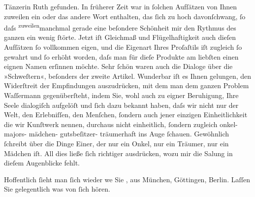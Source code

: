                Tänzerin Ruth gefunden. In früherer Zeit war
               in{ }ſolchen Aufſätzen von Ihnen zuweilen ein oder das andere Wort enthalten, das{ }ſich
               zu hoch davonſchwang,{ }ſo daſs \substVorne{}\textsuperscript{zuweilen}\substDazwischen{}manchmal\substHinten{} gerade eine beſondere Schönheit mir den Rythmus des ganzen ein wenig{ }ſtörte.
               Jetzt iſt Gleichmaß und {\pb}Flügelhaftigkeit auch dieſen
               Aufſätzen{ }ſo vollkommen eigen,  und die
               Eigenart  Ihres Proſaſtils iſt zugleich{ }ſo gewahrt
               und{ }ſo erhöht worden, daſs man für dieſe Produkte am liebſten einen eignen Namen
               erſinnen möchte. Sehr{ }ſchön waren auch die Dialoge über die »Schweſtern«, beſonders der zweite Artikel. Wunderbar iſt es Ihnen gelungen,
               den Widerſtreit der Empfindungen auszudrücken, mit dem man dem ganzen Problem {\pb}Waſſermann gegenüberſteht, indem Sie, wohl
               auch zu eigner Beruhigung, Ihre Seele dialogiſch aufgelöſt und{ }ſich dazu bekannt
               haben, daſs wir nicht nur der Welt, den Erlebniſſen, den Menſchen,{ }ſondern auch jener
               einzigen Einheitlichkeit die wir Kunſtwerk nennen, durchaus nicht einheitlich,{ }ſondern zugleich onkel- majors- mädchen- gutsbeſitzer- träumerhaft ins Auge{ }ſchauen.
               Gewöhnlich{ }ſchreibt über die Dinge Einer, der nur ein Onkel, {\pb}nur ein Träumer, nur ein Mädchen iſt. All dies ließe{ }ſich
               richtiger ausdrücken, wozu mir die Sa{\geminationm}lung in dieſem
               Augenblicke fehlt.\pend
           
\pstart
           Hoffentlich{ }ſieht man{ }ſich wieder we{\geminationn} Sie \label{K_L01638-2v}\label{K_L01638-2}, aus München, Göttingen, Berlin. Laſſen Sie
               gelegentlich was von{ }ſich hören.\pend
           
